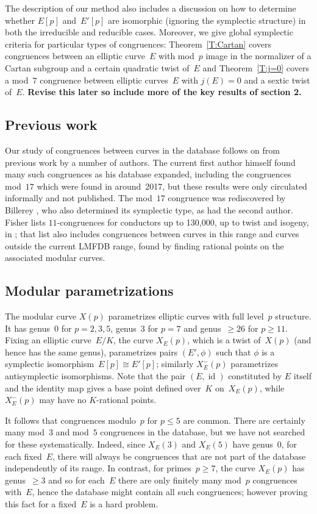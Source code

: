 \documentclass[12pt, reqno]{amsart}
\DeclareMathOperator{\id}{id}
\numberwithin{equation}{section}
\theoremstyle{definition}
\theoremstyle{remark}
\begin{document}
The description of our method also includes a discussion on how to
determine whether $E[p]$ and~$E'[p]$ are isomorphic (ignoring the
symplectic structure) in both the irreducible and reducible
cases. Moreover, we give global symplectic criteria for particular
types of congruences: Theorem~\ref{T:Cartan} covers congruences
between an elliptic curve~$E$ with mod~$p$ image in the normalizer of
a Cartan subgroup and a certain quadratic twist of~$E$ and
Theorem~\ref{T:j=0} covers a mod~$7$ congruence between elliptic
curves~$E$ with $j(E)=0$ and a sextic twist of~$E$.
\textbf{Revise this later so include more of the key results of
  section 2.}

\subsection{Previous work}
Our study of congruences between curves in the database follows on
from previous work by a number of authors.  The current first author
himself found many such congruences as his database expanded,
including the congruences mod~$17$ which were found in around~2017,
but these results were only circulated informally and not published.
The mod~$17$ congruence was rediscovered by Billerey
\cite{Billerey17}, who also determined its symplectic type, as had the
second author.  Fisher lists $11$-congruences for conductors up to
130,000, up to twist and isogeny, in \cite{FisherList}; that list also
includes congruences between curves in this range and curves outside
the current LMFDB range, found by finding rational points on the associated modular
curves.


\subsection{Modular parametrizations}
The modular curve $X(p)$ parametrizes elliptic curves with full
level~$p$ structure. It has genus~$0$ for $p=2,3,5$, genus~$3$ for
$p=7$ and genus~$\ge26$ for $p\ge11$.  Fixing an elliptic
curve~$E/K$, the curve $X_E(p)$, which is a twist of~$X(p)$ (and
hence has the same genus), parametrizes pairs $(E',\phi)$ such that
$\phi$ is a symplectic isomorphism~$E[p]\cong E'[p]$; similarly
$X_E^-(p)$ parametrizes antisymplectic isomorphisms. Note that the pair $(E,\id)$ constituted by $E$ itself and the identity map
gives a base point defined over~$K$ on~$X_E(p)$, while $X_E^-(p)$ may have no $K$-rational points.

It follows that congruences modulo~$p$ for $p\le 5$ are common.  There
are certainly many mod~$3$ and mod~$5$ congruences in the database,
but we have not searched for these systematically. Indeed, since
$X_E(3)$ and $X_E(5)$ have genus~0, for each fixed~$E$, there will
always be congruences that are not part of the database independently
of its range. In contrast, for primes~$p \geq 7$, the curve $X_E(p)$
has genus~$\geq 3$ and so for each~$E$ there are only finitely many
mod~$p$ congruences with~$E$, hence the database
might contain all such congruences; however proving this fact for a
fixed~$E$ is a hard problem.
\end{document}
